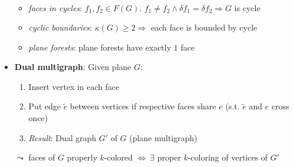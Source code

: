 \begin{itemize}
\begin{itemize}
\begin{align*}
      \end{align*}
      \item \emph{faces in cycles}: $ f_1, f_2 \in F(G) $. $ f_1 \neq f_2 \wedge \delta f_1 = \delta f_2 \Rightarrow G $ is cycle
      \item \emph{cyclic boundaries}: $ \kappa(G) \geq 2 \Rightarrow $ each face is bounded by cycle
    \item \emph{plane forests}: plane forests have exactly $ 1 $ face
  \end{itemize}
  \item \textbf{Dual multigraph}: Given plane $ G $:
  \begin{enumerate}
    \item Insert vertex in each face 
    \item Put edge $ \tilde{e} $ between vertices if respective faces share $ e $ (s.t. $ \tilde{e} $ and $ e $ cross once)
    \item \emph{Result}: Dual graph $ G' $ of $ G $ (plane multigraph)
  \end{enumerate}
  $ \leadsto $ faces of $ G $ properly $ k $-colored $ \Leftrightarrow \ \exists $ proper $ k $-coloring of vertices of $ G' $
\end{itemize}

